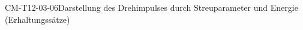 
\begin{PROP}{CM-T12-03-06}{Darstellung des Drehimpulses durch Streuparameter und Energie (Erhaltungssätze)}
\end{PROP}
